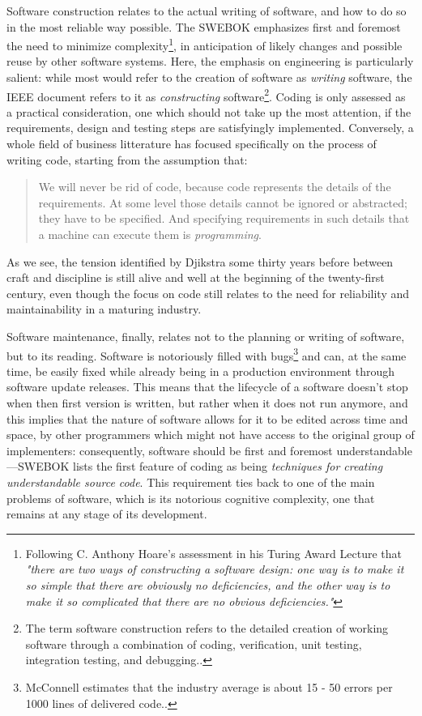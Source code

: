Software construction relates to the actual writing of software, and how to do so in the most reliable way possible. The SWEBOK emphasizes first and foremost the need to minimize complexity\footnote{Following C. Anthony Hoare's assessment in his Turing Award Lecture that \emph{"there are two ways of constructing a software design: one way is to make it so simple that there are obviously no deficiencies, and the other way is to make it so complicated that there are no obvious deficiencies."}}, in anticipation of likely changes and possible reuse by other software systems. Here, the emphasis on engineering is particularly salient: while most would refer to the creation of software as \emph{writing} software, the IEEE document refers to it as \emph{constructing} software\footnote{The term software construction refers to the detailed creation of working software through a combination of coding, verification, unit testing, integration testing, and debugging.\cite{bourque_swebok_2014}.}. Coding is only assessed as a practical consideration, one which should not take up the most attention, if the requirements, design and testing steps are satisfyingly implemented. Conversely, a whole field of business litterature\cite{martin_clean_2008,hendrickson_software_2002,fowler_refactoring_1999,mcconnell_code_2004} has focused specifically on the process of writing code, starting from the assumption that:

\begin{quote}
    We will never be rid of code, because code represents the details of the requirements. At some level those details cannot be ignored or abstracted; they have to be specified. And specifying requirements in such details that a machine can execute them is \emph{programming}.\cite{martin_clean_2008}
\end{quote}

As we see, the tension identified by Djikstra some thirty years before between craft and discipline is still alive and well at the beginning of the twenty-first century, even though the focus on code still relates to the need for reliability and maintainability in a maturing industry.

Software maintenance, finally, relates not to the planning or writing of software, but to its reading. Software is notoriously filled with bugs\footnote{McConnell estimates that the industry average is about 15 - 50 errors per 1000 lines of delivered code.\cite{mcconnell_code_2004}.} and can, at the same time, be easily fixed while already being in a production environment through software update releases. This means that the lifecycle of a software doesn't stop when then first version is written, but rather when it does not run anymore, and this implies that the nature of software allows for it to be edited across time and space, by other programmers which might not have access to the original group of implementers: consequently, software should be first and foremost understandable—SWEBOK lists the first feature of coding as being \emph{techniques for creating understandable source code}\cite{bourque_swebok_2014}. This requirement ties back to one of the main problems of software, which is its notorious cognitive complexity, one that remains at any stage of its development.

